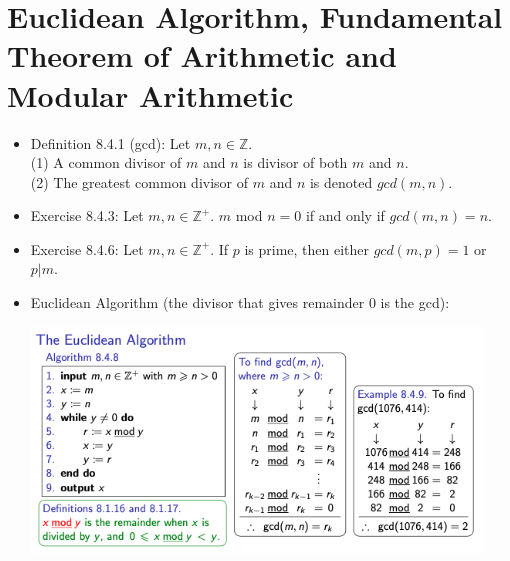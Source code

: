 \documentclass{article}
\begin{document}
\section*{Euclidean Algorithm, Fundamental Theorem of Arithmetic and Modular Arithmetic}
\begin{itemize}
    \item Definition 8.4.1 (gcd): Let $m,n\in \mathbb{Z}$.
        \\ \hspace*{3mm} (1) A common divisor of $m$ and $n$ is divisor of both $m$ and $n$.
        \\ \hspace*{3mm} (2) The greatest common divisor of $m$ and $n$ is denoted $gcd(m,n)$.
    \item Exercise 8.4.3: Let $m,n\in \mathbb{Z}^+$. $m$ mod $n=0$ if and only if $gcd(m,n)=n$.
    \item Exercise 8.4.6: Let $m,n\in \mathbb{Z}^+$. If $p$ is prime, then either $gcd(m,p)=1$ or $p|m$.
    \item Euclidean Algorithm (the divisor that gives remainder 0 is the gcd):

    \begin{center}
        \includegraphics[width=12cm]{images/euclideanalgorithm.png}
    \end{center}


\end{itemize}
\end{document}
